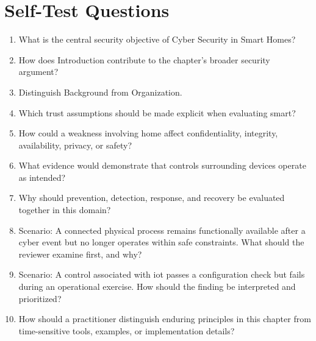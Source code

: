 \documentclass[11pt]{article}
\begin{document}
\section*{Self-Test Questions}
\begin{enumerate}
\item What is the central security objective of Cyber Security in Smart Homes?
\item How does Introduction contribute to the chapter's broader security argument?
\item Distinguish Background from Organization.
\item Which trust assumptions should be made explicit when evaluating smart?
\item How could a weakness involving home affect confidentiality, integrity, availability, privacy, or safety?
\item What evidence would demonstrate that controls surrounding devices operate as intended?
\item Why should prevention, detection, response, and recovery be evaluated together in this domain?
\item Scenario: A connected physical process remains functionally available after a cyber event but no longer operates within safe constraints. What should the reviewer examine first, and why?
\item Scenario: A control associated with iot passes a configuration check but fails during an operational exercise. How should the finding be interpreted and prioritized?
\item How should a practitioner distinguish enduring principles in this chapter from time-sensitive tools, examples, or implementation details?
\end{enumerate}
\end{document}
